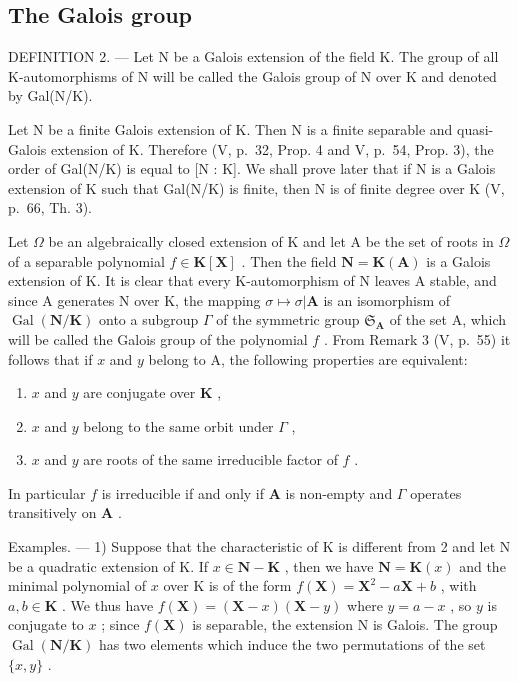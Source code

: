\subsection{The Galois group}

DEFINITION 2. --- Let N be a Galois extension of the field K. The group of all K-automorphisms of N will be called the Galois group of N over K and denoted by Gal(N/K).

Let N be a finite Galois extension of K. Then N is a finite separable and quasi-Galois extension of K. Therefore (V, p.~32, Prop. 4 and V, p.~54, Prop. 3), the order of Gal(N/K) is equal to {[}N : K{]}. We shall prove later that if N is a Galois extension of K such that Gal(N/K) is finite, then N is of finite degree over K (V, p.~66, Th. 3).

Let \(\Omega\) be an algebraically closed extension of K and let A be the set of roots in \(\Omega\) of a separable polynomial \(f \in \mathbf{K}[\mathbf{X}]\) . Then the field \(\mathbf{N} = \mathbf{K}(\mathbf{A})\) is a Galois extension of K. It is clear that every K-automorphism of N leaves A stable, and since A generates N over K, the mapping \(\sigma \mapsto \sigma | \mathbf{A}\) is an isomorphism of \(\operatorname{Gal}(\mathbf{N} / \mathbf{K})\) onto a subgroup \(\Gamma\) of the symmetric group \(\mathfrak{S}_{\mathbf{A}}\) of the set A, which will be called the Galois group of the polynomial \(f\) . From Remark 3 (V, p.~55) it follows that if \(x\) and \(y\) belong to A, the following properties are equivalent:

\begin{enumerate}
\def\labelenumi{\alph{enumi})}
\item
  \(x\) and \(y\) are conjugate over \(\mathbf{K}\) ,
\item
  \(x\) and \(y\) belong to the same orbit under \(\Gamma\) ,
\item
  \(x\) and \(y\) are roots of the same irreducible factor of \(f\) .
\end{enumerate}

In particular \(f\) is irreducible if and only if \(\mathbf{A}\) is non-empty and \(\Gamma\) operates transitively on \(\mathbf{A}\) .

Examples. --- 1) Suppose that the characteristic of K is different from 2 and let N be a quadratic extension of K. If \(x \in \mathbf{N} - \mathbf{K}\) , then we have \(\mathbf{N} = \mathbf{K}(x)\) and the minimal polynomial of \(x\) over K is of the form \(f(\mathbf{X}) = \mathbf{X}^2 - a\mathbf{X} + b\) , with \(a, b \in \mathbf{K}\) . We thus have \(f(\mathbf{X}) = (\mathbf{X} - x)(\mathbf{X} - y)\) where \(y = a - x\) , so \(y\) is conjugate to \(x\) ; since \(f(\mathbf{X})\) is separable, the extension N is Galois. The group \(\operatorname{Gal}(\mathbf{N}/\mathbf{K})\) has two elements which induce the two permutations of the set \(\{x, y\}\) .

